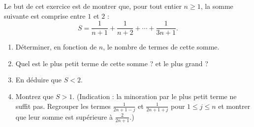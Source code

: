 Le but de cet exercice est de montrer que, pour tout entier $n \geq 1$, la
somme suivante est comprise entre $1$ et $2$ :
\[
S = \frac{1}{n+1} + \frac{1}{n+2} + \cdots + \frac{1}{3n+1}.
\]
\begin{enumerate}
  \item Déterminer, en fonction de $n$, le nombre de termes de cette somme.
  \item Quel est le plus petit terme de cette somme ? et le plus grand ?
  \item En déduire que $S < 2$.
  \item Montrez que $S > 1$. (Indication : la minoration par le plus petit terme
  ne suffit pas. Regrouper les termes $\frac{1}{2n+1-j}$ et
  $\frac{1}{2n+1+j}$ pour $1 \leq j \leq n$ et montrer que leur somme est
  supérieure à $\frac{2}{2n+1}$.)
\end{enumerate}
